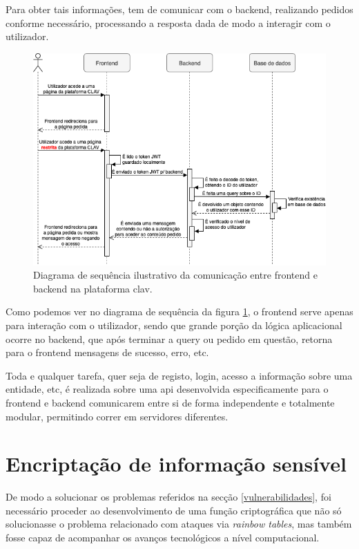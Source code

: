 Para obter tais informações, tem de comunicar com o backend, realizando pedidos conforme necessário, processando a resposta dada de modo a interagir com o utilizador. 

\vspace{5mm}
\begin{figure}[h!]
    \centering
    \includegraphics[width=\textwidth]{img/diagramas/sequencia/DiagramasSequencia.png}
    \caption{Diagrama de sequência ilustrativo da comunicação entre frontend e backend na plataforma \gls{clav}.}
    \label{fig:diagramaPaginaRestrita}
\end{figure}

Como podemos ver no diagrama de sequência da figura \ref{fig:diagramaPaginaRestrita}, o frontend serve apenas para interação com o utilizador, sendo que grande porção da lógica aplicacional ocorre no backend, que após terminar a query ou pedido em questão, retorna para o frontend mensagens de sucesso, erro, etc.

Toda e qualquer tarefa, quer seja de registo, login, acesso a informação sobre uma entidade, etc, é realizada sobre uma \gls{api} desenvolvida especificamente para o frontend e backend comunicarem entre si de forma independente e totalmente modular, permitindo correr em servidores diferentes.

\cleardoublepage
\section{Encriptação de informação sensível} \label{encryption}

De modo a solucionar os problemas referidos na secção \ref{vulnerabilidades}, foi necessário proceder ao desenvolvimento de uma função criptográfica que não só solucionasse o problema relacionado com ataques via \emph{rainbow tables}, mas também fosse capaz de acompanhar os avanços tecnológicos a nível computacional.

